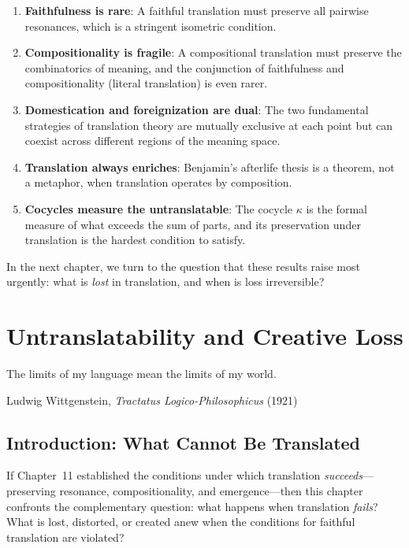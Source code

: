 \begin{enumerate}
\item \textbf{Faithfulness is rare}: A faithful translation must preserve all
pairwise resonances, which is a stringent isometric condition.

\item \textbf{Compositionality is fragile}: A compositional translation must
preserve the combinatorics of meaning, and the conjunction of faithfulness
and compositionality (literal translation) is even rarer.

\item \textbf{Domestication and foreignization are dual}: The two fundamental
strategies of translation theory are mutually exclusive at each point but
can coexist across different regions of the meaning space.

\item \textbf{Translation always enriches}: Benjamin's afterlife thesis is
a theorem, not a metaphor, when translation operates by composition.

\item \textbf{Cocycles measure the untranslatable}: The cocycle $\kappa$ is
the formal measure of what exceeds the sum of parts, and its preservation
under translation is the hardest condition to satisfy.
\end{enumerate}

In the next chapter, we turn to the question that these results raise most
urgently: what is \emph{lost} in translation, and when is loss irreversible?



\chapter{Untranslatability and Creative Loss}
\label{ch:untranslatability}

\epigraph{The limits of my language mean the limits of my world.}%
{Ludwig Wittgenstein, \emph{Tractatus Logico-Philosophicus} (1921)}

\section{Introduction: What Cannot Be Translated}

If Chapter~11 established the conditions under which translation
\emph{succeeds}---preserving resonance, compositionality, and emergence---then
this chapter confronts the complementary question: what happens when
translation \emph{fails}?  What is lost, distorted, or created anew when
the conditions for faithful translation are violated?

